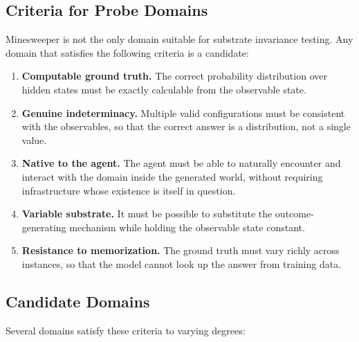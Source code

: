 \documentclass[12pt,a4paper]{article}
\begin{document}
\subsection{Criteria for Probe Domains}
\label{sec:criteria}

Minesweeper is not the only domain suitable for substrate invariance testing. Any domain that satisfies the following criteria is a candidate:

\begin{enumerate}[nosep]
    \item \textbf{Computable ground truth.} The correct probability distribution over hidden states must be exactly calculable from the observable state.
    \item \textbf{Genuine indeterminacy.} Multiple valid configurations must be consistent with the observables, so that the correct answer is a distribution, not a single value.
    \item \textbf{Native to the agent.} The agent must be able to naturally encounter and interact with the domain inside the generated world, without requiring infrastructure whose existence is itself in question.
    \item \textbf{Variable substrate.} It must be possible to substitute the outcome-generating mechanism while holding the observable state constant.
    \item \textbf{Resistance to memorization.} The ground truth must vary richly across instances, so that the model cannot look up the answer from training data.
\end{enumerate}

\subsection{Candidate Domains}
\label{sec:candidates}

Several domains satisfy these criteria to varying degrees:
\end{document}
